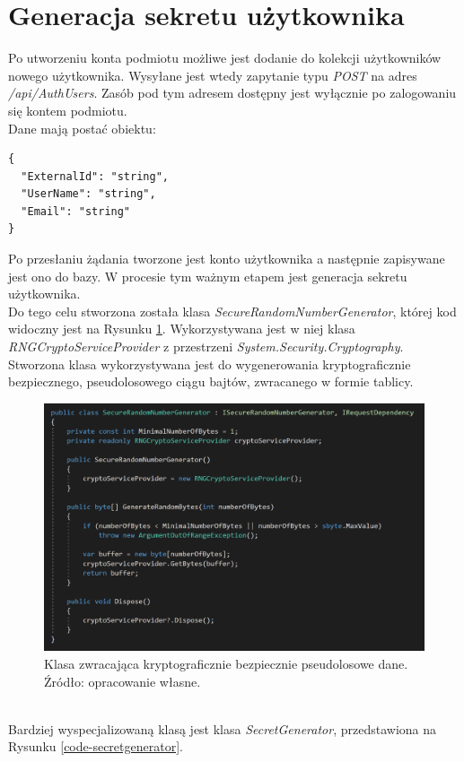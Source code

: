 \section{Generacja sekretu użytkownika}
Po utworzeniu konta podmiotu możliwe jest dodanie do kolekcji użytkowników nowego użytkownika. 
Wysyłane jest wtedy zapytanie typu \textit{POST} na adres \textit{/api/AuthUsers}. Zasób pod tym adresem dostępny jest 
wyłącznie po zalogowaniu się kontem podmiotu. \\
Dane mają postać obiektu:
\begin{lstlisting}
{
  "ExternalId": "string",
  "UserName": "string",
  "Email": "string"
}
\end{lstlisting}
Po przesłaniu żądania tworzone jest konto użytkownika a następnie zapisywane jest ono do bazy. 
W procesie tym ważnym etapem jest generacja sekretu użytkownika. \\ 
Do tego celu stworzona została klasa \textit{SecureRandomNumberGenerator}, której kod widoczny jest na Rysunku \ref{code-srng}.
Wykorzystywana jest w niej klasa \textit{RNGCryptoServiceProvider} z przestrzeni \textit{System.Security.Cryptography}.
Stworzona klasa wykorzystywana jest do wygenerowania kryptograficznie bezpiecznego, pseudolosowego ciągu bajtów, zwracanego 
w formie tablicy.
\begin{figure}[t]
    \centering
	\includegraphics[width=\textwidth]{content/images/code-srng}
    \caption{Klasa zwracająca kryptograficznie bezpiecznie pseudolosowe dane. Źródło: opracowanie własne.}
    \label{code-srng}
\end{figure} \\
Bardziej wyspecjalizowaną klasą jest klasa \textit{SecretGenerator}, przedstawiona na Rysunku \ref{code-secretgenerator}.
